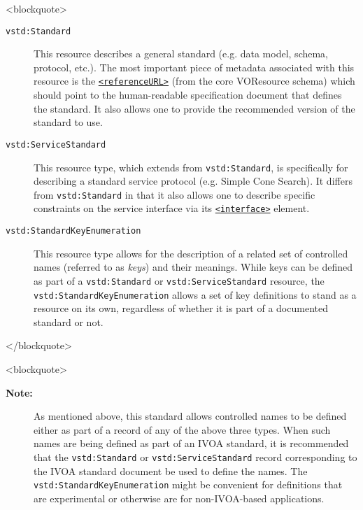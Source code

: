 \documentclass[11pt,a4paper]{ivoa}
\begin{document}
{{<blockquote>
\begin{description}
\item[\texttt{vstd:Standard}] This resource describes a general standard (e.g. data model,
       schema, protocol, etc.).  The most important piece of metadata
       associated with this resource is the
       \href{http://www.ivoa.net/Documents/REC/ReR/VOResource-20080222.html#content}{\texttt{<referenceURL>}}
       (from the core VOResource schema) 
       which should point to the human-readable specification document
       that defines the standard.  It also allows one to provide the
       recommended version of the standard to use.  
\item[\texttt{vstd:ServiceStandard}] This resource type, which extends from
       \texttt{vstd:Standard}, is specifically for describing a
       standard service protocol (e.g. Simple Cone Search).  It
       differs from \texttt{vstd:Standard} in that it also allows
       one to describe specific constraints on the service interface
       via its
\href{http://www.ivoa.net/Documents/REC/ReR/VOResource-20080222.html#d:interface}{\texttt{<interface>}}
       element. 
\item[\texttt{vstd:StandardKeyEnumeration}] This resource type allows for the description of a related set of 
       controlled names (referred to as \emph{keys}) and their
       meanings.  While keys can be defined as part of a
       \texttt{vstd:Standard} or \texttt{vstd:ServiceStandard}
       resource, the \texttt{vstd:StandardKeyEnumeration} allows 
       a set of key definitions to stand as a resource on its own,
       regardless of whether it is part of a documented standard or
       not.  

\end{description}

</blockquote>

<blockquote>
\begin{table}
\begin{tabular}[FIXTHIS]

\begin{description}
\item[\textbf{Note:}] As mentioned above, this standard allows controlled names to be
       defined either as part of a record of any of the above three
       types.  When such names are being defined as part of an IVOA
       standard, it is recommended that the \texttt{vstd:Standard} or
       \texttt{vstd:ServiceStandard} record corresponding to the
       IVOA standard document be used to define the names.  The
       \texttt{vstd:StandardKeyEnumeration} might be convenient
       for definitions that are experimental or otherwise are for
       non-IVOA-based applications.  


\end{description}
\end{tabular}
\end{table}}}
\end{document}
